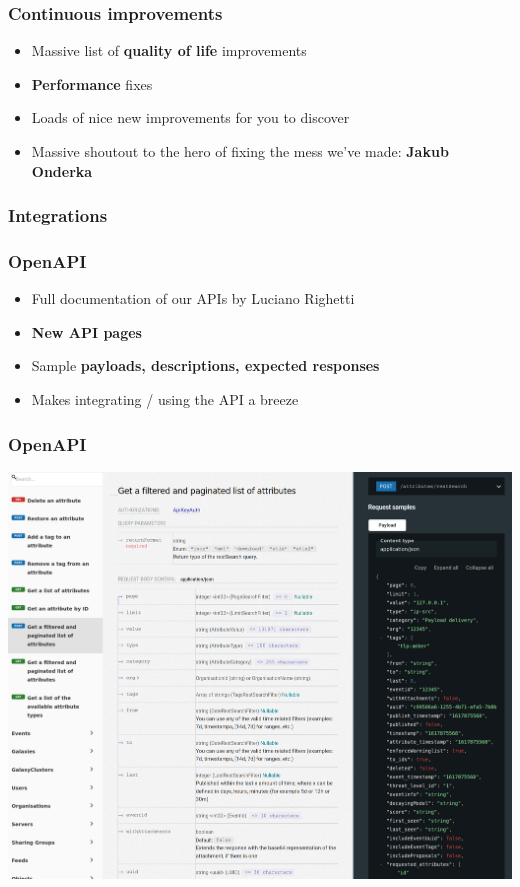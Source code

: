 \begin{frame}
  \frametitle{Continuous improvements}
  \begin{itemize}
      \item Massive list of {\bf quality of life} improvements
      \item {\bf Performance} fixes
      \item Loads of nice new improvements for you to discover
      \item Massive shoutout to the hero of fixing the mess we've made: {\bf Jakub Onderka}
  \end{itemize}
\end{frame}


\begin{frame}
  \frametitle{Integrations}
\end{frame}

\begin{frame}
  \frametitle{OpenAPI}
  \begin{itemize}
     \item Full documentation of our APIs by Luciano Righetti
     \item {\bf New API pages}
     \item Sample {\bf payloads, descriptions, expected responses}
     \item Makes integrating / using the API a breeze
  \end{itemize}
\end{frame}

\begin{frame}
\frametitle{OpenAPI}
\includegraphics[scale=0.15]{images/openapi_page.png}
\end{frame}

